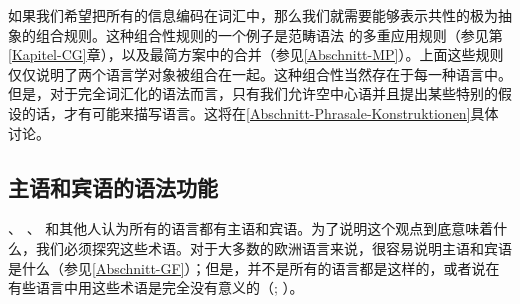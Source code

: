 如果我们希望把所有的信息编码在词汇中，那么我们就需要能够表示共性的极为抽象的组合规则。这种组合性规则的一个例子是范畴语法 的多重应用规则（参见第\ref{Kapitel-CG}章），以及最简方案\indexmpc 中的合并（参见\ref{Abschnitt-MP}）。上面这些规则仅仅说明了两个语言学对象被组合在一起。这种组合性当然存在于每一种语言中。但是，对于完全词汇化的语法而言，只有我们允许空中心语并且提出某些特别的假设的话，才有可能来描写语言。这将在\ref{Abschnitt-Phrasale-Konstruktionen}具体讨论。 

\subsection{主语和宾语的语法功能}
\label{Abschnitt-UG-EPP}

\mbox{} \citet[\page xxv]{BK82a}、 \citet[--237]{Pinker94a}、 \citet[]{Baker2003b}和其他人认为所有的语言都有主语和宾语。为了说明这个观点到底意味着什么，我们必须探究这些术语。对于大多数的欧洲语言来说，很容易说明主语和宾语是什么（参见\ref{Abschnitt-GF}）；但是，并不是所有的语言都是这样的，或者说在有些语言中用这些术语是完全没有意义的（\citealp[\S~4]{Croft2001a}; \citealp[\S~4]{EL2009a}）。

